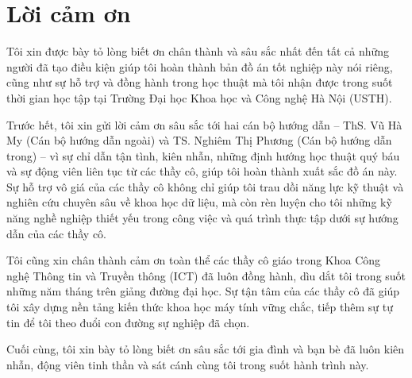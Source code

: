 \chapter*{Lời cảm ơn}

Tôi xin được bày tỏ lòng biết ơn chân thành và sâu sắc nhất đến tất cả những người đã tạo điều kiện giúp tôi hoàn thành bản đồ án tốt nghiệp này nói riêng, cũng như sự hỗ trợ và đồng hành trong học thuật mà tôi nhận được trong suốt thời gian học tập tại Trường Đại học Khoa học và Công nghệ Hà Nội (USTH).

Trước hết, tôi xin gửi lời cảm ơn sâu sắc tới hai cán bộ hướng dẫn -- ThS. Vũ Hà My (Cán bộ hướng dẫn ngoài) và TS. Nghiêm Thị Phương (Cán bộ hướng dẫn trong) -- vì sự chỉ dẫn tận tình, kiên nhẫn, những định hướng học thuật quý báu và sự động viên liên tục từ các thầy cô, giúp tôi hoàn thành xuất sắc đồ án này. Sự hỗ trợ vô giá của các thầy cô không chỉ giúp tôi trau dồi năng lực kỹ thuật và nghiên cứu chuyên sâu về khoa học dữ liệu, mà còn rèn luyện cho tôi những kỹ năng nghề nghiệp thiết yếu trong công việc và quá trình thực tập dưới sự hướng dẫn của các thầy cô.

Tôi cũng xin chân thành cảm ơn toàn thể các thầy cô giáo trong Khoa Công nghệ Thông tin và Truyền thông (ICT) đã luôn đồng hành, dìu dắt tôi trong suốt những năm tháng trên giảng đường đại học. Sự tận tâm của các thầy cô đã giúp tôi xây dựng nền tảng kiến thức khoa học máy tính vững chắc, tiếp thêm sự tự tin để tôi theo đuổi con đường sự nghiệp đã chọn.

Cuối cùng, tôi xin bày tỏ lòng biết ơn sâu sắc tới gia đình và bạn bè đã luôn kiên nhẫn, động viên tinh thần và sát cánh cùng tôi trong suốt hành trình này.
